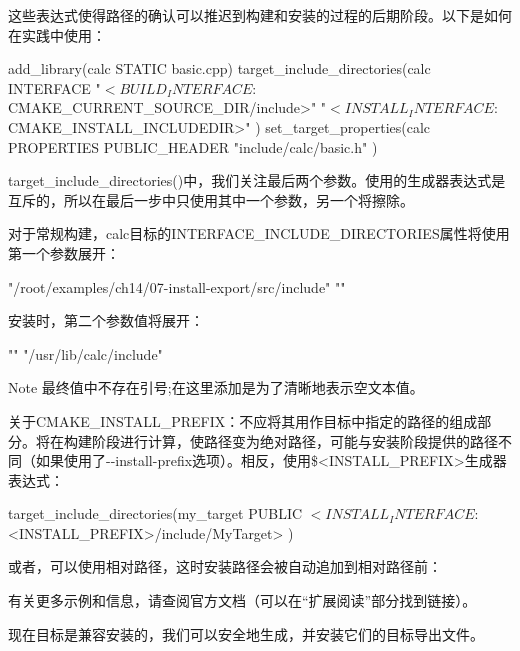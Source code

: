 这些表达式使得路径的确认可以推迟到构建和安装的过程的后期阶段。以下是如何在实践中使用：


\begin{cmake}
add_library(calc STATIC basic.cpp)
target_include_directories(calc INTERFACE
    "$<BUILD_INTERFACE:${CMAKE_CURRENT_SOURCE_DIR}/include>"
    "$<INSTALL_INTERFACE:${CMAKE_INSTALL_INCLUDEDIR}>"
)
set_target_properties(calc PROPERTIES
    PUBLIC_HEADER "include/calc/basic.h"
)
\end{cmake}

target\_include\_directories()中，我们关注最后两个参数。使用的生成器表达式是互斥的，所以在最后一步中只使用其中一个参数，另一个将擦除。

对于常规构建，calc目标的INTERFACE\_INCLUDE\_DIRECTORIES属性将使用第一个参数展开：

\begin{cmake}
"/root/examples/ch14/07-install-export/src/include" ""
\end{cmake}

安装时，第二个参数值将展开：

\begin{cmake}
"" "/usr/lib/calc/include"
\end{cmake}

\begin{myNotic}{Note}
最终值中不存在引号;在这里添加是为了清晰地表示空文本值。
\end{myNotic}

关于CMAKE\_INSTALL\_PREFIX：不应将其用作目标中指定的路径的组成部分。将在构建阶段进行计算，使路径变为绝对路径，可能与安装阶段提供的路径不同（如果使用了-{}-install-prefix选项）。相反，使用\$<INSTALL\_PREFIX>生成器表达式：

\begin{cmake}
target_include_directories(my_target PUBLIC
    $<INSTALL_INTERFACE:$<INSTALL_PREFIX>/include/MyTarget>
)
\end{cmake}

或者，可以使用相对路径，这时安装路径会被自动追加到相对路径前：


有关更多示例和信息，请查阅官方文档（可以在“扩展阅读”部分找到链接）。

现在目标是兼容安装的，我们可以安全地生成，并安装它们的目标导出文件。

